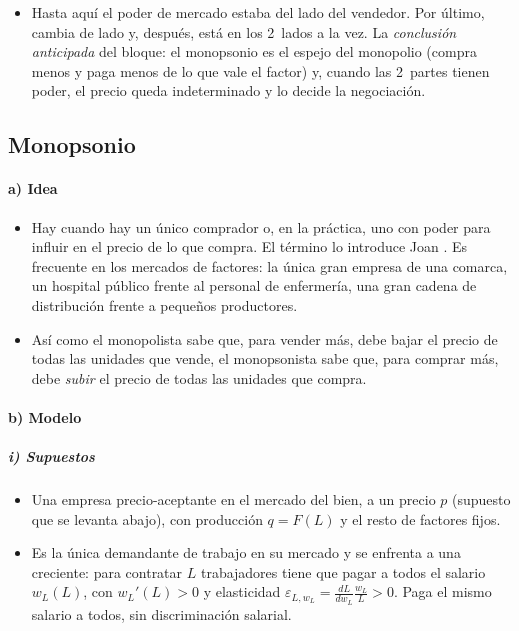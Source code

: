 \documentclass[11pt]{article}
\begin{document}
\begin{itemize}
\item Hasta aquí el poder de mercado estaba del lado del vendedor. Por último, cambia de lado y, después, está en los 2~lados a la vez. La \emph{conclusión anticipada} del bloque: el monopsonio es el espejo del monopolio (compra menos y paga menos de lo que vale el factor) y, cuando las 2~partes tienen poder, el precio queda indeterminado y lo decide la negociación.
\end{itemize}

\subsection{Monopsonio}\label{sec:monopsonio}

\paragraph{a) Idea}

\begin{itemize}
\item Hay  cuando hay un único comprador o, en la práctica, uno con poder para influir en el precio de lo que compra. El término lo introduce Joan \textcite{Robinson1933Economics}. Es frecuente en los mercados de factores: la única gran empresa de una comarca, un hospital público frente al personal de enfermería, una gran cadena de distribución frente a pequeños productores.
\item Así como el monopolista sabe que, para vender más, debe bajar el precio de todas las unidades que vende, el monopsonista sabe que, para comprar más, debe \emph{subir} el precio de todas las unidades que compra.
\end{itemize}

\paragraph{b) Modelo}

\subparagraph{i) Supuestos}

\begin{itemize}
\item Una empresa precio-aceptante en el mercado del bien, a un precio $p$ (supuesto que se levanta abajo), con producción $q=F(L)$ y el resto de factores fijos.
\item Es la única demandante de trabajo en su mercado y se enfrenta a una  creciente: para contratar $L$ trabajadores tiene que pagar a todos el salario $w_L(L)$, con $w_L'(L)>0$ y elasticidad $\varepsilon_{L,w_L}=\frac{dL}{dw_L}\frac{w_L}{L}>0$. Paga el mismo salario a todos, sin discriminación salarial.
\end{itemize}
\end{document}

